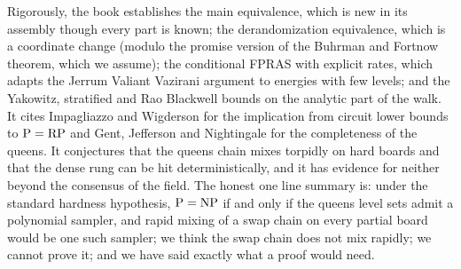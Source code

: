 Rigorously, the book establishes the main equivalence, which is new in its assembly though every part is known; the derandomization equivalence, which is a coordinate change (modulo the promise version of the Buhrman and Fortnow theorem, which we assume); the conditional FPRAS with explicit rates, which adapts the Jerrum Valiant Vazirani argument to energies with few levels; and the Yakowitz, stratified and Rao Blackwell bounds on the analytic part of the walk. It cites Impagliazzo and Wigderson \cite{IW} for the implication from circuit lower bounds to $\mathrm{P} = \mathrm{RP}$ and Gent, Jefferson and Nightingale \cite{GJN} for the completeness of the queens. It conjectures that the queens chain mixes torpidly on hard boards and that the dense rung can be hit deterministically, and it has evidence for neither beyond the consensus of the field. The honest one line summary is: under the standard hardness hypothesis, $\mathrm{P} = \mathrm{NP}$ if and only if the queens level sets admit a polynomial sampler, and rapid mixing of a swap chain on every partial board would be one such sampler; we think the swap chain does not mix rapidly; we cannot prove it; and we have said exactly what a proof would need.
